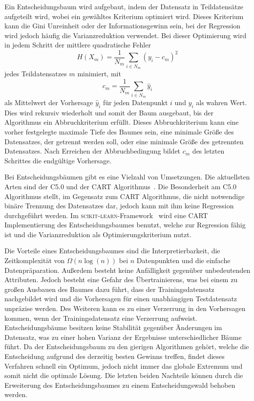 Ein Entscheidungsbaum wird aufgebaut, indem der Datensatz in Teildatensätze aufgeteilt wird, wobei ein gewähltes Kriterium optimiert wird.
Dieses Kriterium
kann die Gini Unreinheit oder der Informationsgewinn sein, bei der Regression wird jedoch häufig die Varianzreduktion verwendet.
Bei dieser Optimierung wird in jedem Schritt der mittlere quadratische Fehler
\begin{equation}
  H(X_m) = \frac{1}{N_m}\sum_{i\in N_m}(y_i-c_m)^2
\end{equation}
jedes Teildatensatzes $m$ minimiert, mit
\begin{equation}
  c_m = \frac{1}{N_m}\sum_{i\in N_m}\hat{y}_i
\end{equation}
als Mittelwert der Vorhersage $\hat{y}_i$ für jeden Datenpunkt $i$ und $y_i$ als wahren Wert.
Dies wird rekursiv wiederholt und somit der Baum ausgebaut, bis der Algorithmus ein Abbruchkriterium erfüllt.
Dieses Abbruchkriterium kann eine vorher festgelegte maximale Tiefe
des Baumes sein, eine minimale Größe des Datensatzes, der getrennt werden soll, oder eine minimale Größe des getrennten Datensatzes. Nach Erreichen der Abbruchbedingung bildet
$c_m$ des letzten Schrittes die endgültige Vorhersage.

Bei Entscheidungsbäumen gibt es eine Vielzahl von Umsetzungen.
Die aktuellsten Arten sind der C5.0 und der CART Algorithmus~\cite[1]{CART}.
Die Besonderheit am C5.0 Algorithmus stellt, im Gegensatz zum CART Algorithmus, die nicht notwendige binäre Trennung des Datensatzes dar,
jedoch kann mit ihm keine Regression durchgeführt werden.
Im \textsc{scikit-learn}-Framework~\cite{scikit-learn} wird eine CART Implementierung des Entscheidungsbaumes benutzt, welche zur
Regression fähig ist und die Varianzreduktion als Optimierungskriterium nutzt.

Die Vorteile eines Entscheidungsbaumes sind die Interpretierbarkeit, die Zeitkomplexität von $\Omega(n\log(n))$ bei $n$ Datenpunkten und die einfache Datenpräparation.
Außerdem besteht keine Anfälligkeit gegenüber unbedeutenden Attributen.
Jedoch besteht eine Gefahr des Übertrainierens, was bei einem zu großen Ausbauen des Baumes dazu führt, dass der Trainingsdatensatz nachgebildet
wird und die Vorhersagen für einen unabhängigen Testdatensatz unpräzise werden.
Des Weiteren kann es zu einer Verzerrung in den Vorhersagen kommen, wenn der Trainingsdatensatz eine Verzerrung aufweist.
Entscheidungsbäume besitzen keine Stabilität gegenüber Änderungen im Datensatz, was zu einer hohen Varianz der Ergebnisse
unterschiedlicher Bäume führt.
Da der Entscheidungsbaum zu den gierigen Algorithmen gehört, welche die Entscheidung aufgrund des derzeitig besten Gewinns treffen, findet dieses Verfahren schnell ein
Optimum, jedoch nicht immer das globale Extremum und somit nicht die optimale Lösung.
Die letzten beiden Nachteile können durch die Erweiterung des Entscheidungsbaumes zu einem Entscheidungswald behoben werden.

